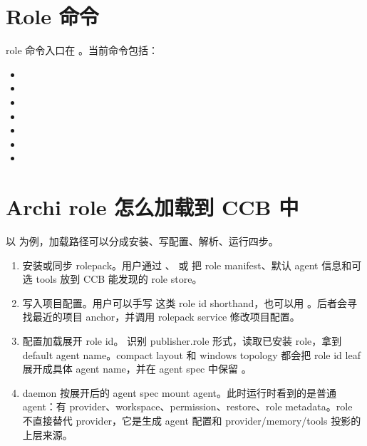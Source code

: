 \section{Role 命令}

role 命令入口在 。当前命令包括：

\begin{itemize}
  \item {}
  \item {}
  \item {}
  \item {}
  \item {}
  \item {}
  \item {}
\end{itemize}

\section{Archi role 怎么加载到 CCB 中}

以  为例，加载路径可以分成安装、写配置、解析、运行四步。

\begin{enumerate}
  \item 安装或同步 rolepack。用户通过 、 或  把 role manifest、默认 agent 信息和可选 tools 放到 CCB 能发现的 role store。
  \item 写入项目配置。用户可以手写  这类 role id shorthand，也可以用 。后者会寻找最近的项目  anchor，并调用 rolepack service 修改项目配置。
  \item 配置加载展开 role id。 识别 publisher.role 形式，读取已安装 role，拿到 default agent name。compact layout 和 windows topology 都会把 role id leaf 展开成具体 agent name，并在 agent spec 中保留 。
  \item daemon 按展开后的 agent spec mount agent。此时运行时看到的是普通 agent：有 provider、workspace、permission、restore、role metadata。role 不直接替代 provider，它是生成 agent 配置和 provider/memory/tools 投影的上层来源。
\end{enumerate}


